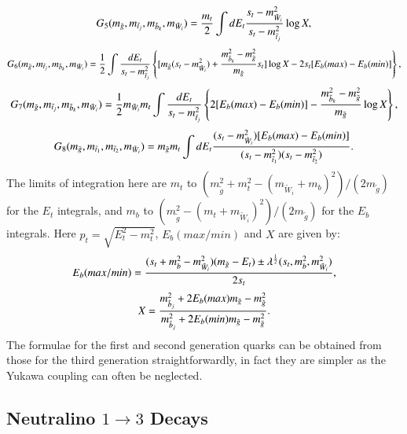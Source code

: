 \documentclass[final,3p,times,pdflatex]{elsarticle}
\begin{document}
\begin{equation}
G_{5}(m_{\tilde{g}},m_{\tilde{t}_j},m_{\tilde{b}_k},m_{\tilde{W}_i}) = {m_{t} \over 2} \int {d E_{t}} {s_t -m_{\tilde{W}_i}^2 \over s_t - m_{\tilde{t}_j}^2} \log X,
\end{equation}
\begin{equation}
G_{6}(m_{\tilde{g}},m_{\tilde{t}_j},m_{\tilde{b}_k},m_{\tilde{W}_i}) = {1 \over 2} \int {d E_t \over s_t - m_{\tilde{t}_j}^2} \left\lbrace [ m_{\tilde{g}} (s_{t} - m_{\tilde{W}_i}^2) + {m_{\tilde{b}_k}^2 - m_{\tilde{g}}^2 \over m_{\tilde{g}}} s_{t}] \log X - 2 s_{t} [E_{b}(max) - E_{b}(min)] \right\rbrace,
\end{equation}
\begin{equation}
G_{7}(m_{\tilde{g}},m_{\tilde{t}_j},m_{\tilde{b}_k},m_{\tilde{W}_i}) = {1 \over 2} m_{\tilde{W}_i} m_{t} \int {d E_t \over s_t - m_{\tilde{t}_j}^2} \left\lbrace 2[E_{b}(max) - E_{b}(min)] - {m_{\tilde{b}_k}^2 - m_{\tilde{g}}^2 \over m_{\tilde{g}}} \log X \right\rbrace,
\end{equation}
\begin{equation}
G_{8}(m_{\tilde{g}},m_{\tilde{t}_1},m_{\tilde{t}_2},m_{\tilde{W}_i}) = m_{\tilde{g}} m_{t} \int {d E_t} {(s_{t} - m_{\tilde{W}_i}^2) [E_{b}(max) - E_{b}(min)] \over (s_{t} - m_{\tilde{t}_1}^2)(s_{t} - m_{\tilde{t}_2}^2)}.
\end{equation}
The limits of integration here are $m_t$ to $(m_{\tilde{g}}^2 + m_{t}^2 - (m_{\tilde{W}_i}+m_{b})^2)/(2m_{\tilde{g}})$ for the $E_t$ integrals, and $m_{b}$ to $(m_{\tilde{g}}^2 - (m_t + m_{\tilde{W}_i})^2)/(2 m_{\tilde{g}})$ for the $E_b$ integrals.
Here $p_t = \sqrt{E_{t}^2 - m_{t}^2}$, $E_{b}(max/min)$ and $X$ are given by:
\begin{equation}
E_{b}(max/min) = {(s_{t} + m_{b}^2 - m_{\tilde{W}_i}^2)(m_{\tilde{g}} - E_{t}) \pm \lambda^{1 \over 2}(s_{t},m_{b}^2,m_{\tilde{W}_i}^2) \over 2 s_{t}},
\end{equation}
\begin{equation}
X = {m_{\tilde{b}_j}^2 + 2 E_{b}(max) m_{\tilde{g}} - m_{\tilde{g}}^2 \over m_{\tilde{b}_j}^2 + 2 E_{b}(min) m_{\tilde{g}} - m_{\tilde{g}}^2}.
\end{equation}
The formulae for the first and second generation quarks can be obtained from those for the third generation straightforwardly, in fact they are simpler as the Yukawa coupling can often be neglected.
\subsection{Neutralino $1 \rightarrow 3$ Decays}
\end{document}

